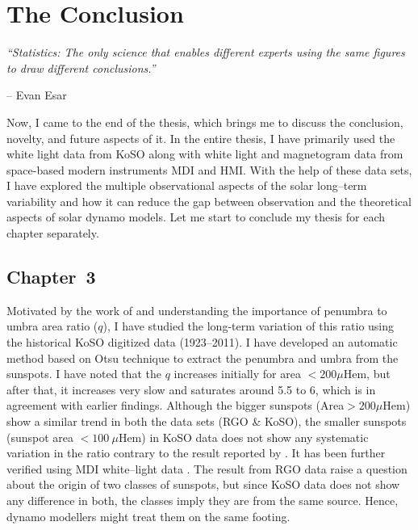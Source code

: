 \chapter[The Conclusion]{The Conclusion}
\label{Chap7}
\epigraph{\itshape ``Statistics: The only science that enables different experts using the same figures to draw different conclusions.''}{-- Evan Esar
}



\noindent

Now, I came to the end of the thesis, which brings me to discuss the conclusion, novelty, and future aspects of it. In the entire thesis, I have primarily used the white light data from KoSO along with white light and magnetogram data from space-based modern instruments MDI and HMI. With the help of these data sets, I have explored the multiple observational aspects of the solar long--term variability and how it can reduce the gap between observation and the theoretical aspects of solar dynamo models. Let me start to conclude my thesis for each chapter separately.

\section{Chapter~3}

Motivated by the work of \citet[references therein]{Hathaway2013} and understanding the importance of penumbra to umbra area ratio ($q$), I have studied the long-term variation of this ratio using the historical KoSO digitized data (1923--2011). I have developed an automatic method based on Otsu technique to extract the penumbra and umbra from the sunspots. I have noted that the $q$ increases initially for area $<200\mu$Hem, but after that, it increases very slow and saturates around 5.5 to 6, which is in agreement with earlier findings. Although the bigger sunspots (Area$>200\mu$Hem) show a similar trend in both the data sets (RGO \& KoSO), the smaller sunspots (sunspot area $<100~\mu$Hem) in KoSO data does not show any systematic variation in the ratio contrary to the result reported by \citet{Hathaway2013}. It has been further verified using MDI white--light data \citep{Jha2019}. The result from RGO data raise a question about the origin of two classes of sunspots, but since KoSO data does not show any difference in both, the classes imply they are from the same source. Hence, dynamo modellers might treat them on the same footing.


